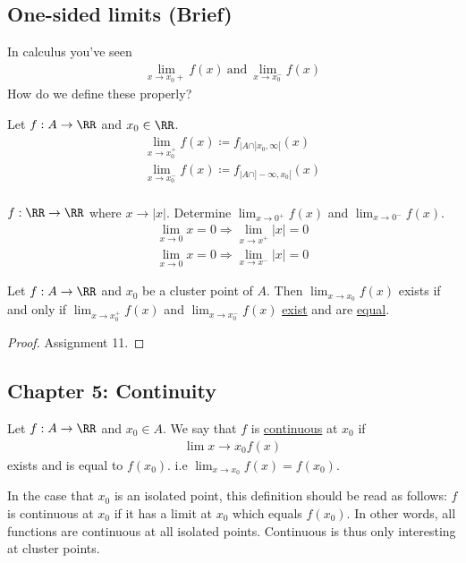 \documentclass[class=scrartcl, crop=false]{standalone}
\begin{document}
\subsection{One-sided limits (Brief)}

In calculus you've seen 
\begin{gather*}
  \lim_{x \to x_0+}f(x) \ \text{and} \  \lim_{x \to x_0^-}f(x)
\end{gather*} How do we define these properly? 

\begin{definition}
  Let $f: A \to \RR$ and $x_0 \in \RR$.
  \begin{gather*}
    \lim_{x \to x_0^+}f(x) \coloneqq f_{\big|A \cap ]x_0, \infty[ }(x) \\
    \lim_{x \to x_0^-}f(x) \coloneqq f_{\big|A \cap ]-\infty, x_0[ }(x) \\
  \end{gather*} 
\end{definition} 

\begin{example}
  $f: \RR \to \RR$ where $x \to |x|$. Determine $\lim_{x \to 0^+} f(x)$ and $\lim_{x \to 0^-}f(x)$.
  \begin{gather*}
    \lim_{x \to 0}x = 0 \Rightarrow \lim_{x \to x^+}|x| = 0 \\
    \lim_{x \to 0}x = 0 \Rightarrow \lim_{x \to x^-}|x| = 0
  \end{gather*} 
\end{example} 

\begin{theorem}
  Let $f: A \to \RR$ and $x_0$ be a cluster point of $A$. Then $\lim_{x \to x_0}f(x)$ exists if and only if $\lim_{x \to x_0^+} f(x)$ and $\lim_{x \to x_0^-}f(x)$ \ul{exist} and are \ul{equal}.
  \begin{proof}
    Assignment 11.
  \end{proof} 
\end{theorem} 

\subsection{Chapter 5: Continuity}

\begin{definition}
  Let $f: A \to \RR$ and $x_0 \in A$. We say that $f$ is \ul{continuous} at $x_0$ if 
  \begin{gather*}
    \lim{x \to x_0} f(x)
  \end{gather*} 
  exists and is equal to $f(x_0)$. i.e $\lim_{x \to x_0} f(x) = f(x_0)$.
  \begin{remark}
    In the case that $x_0$ is an isolated point, this definition should be read as follows: $f$ is continuous at $x_0$ if it has a limit at $x_0$ which equals $f(x_0)$. In other words, all functions are continuous at all isolated points. Continuous is thus only interesting at cluster points.
  \end{remark} 
\end{definition} 
\end{document}
